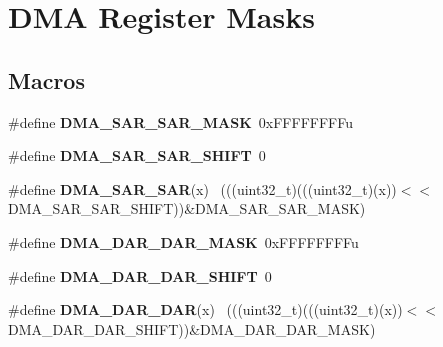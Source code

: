\hypertarget{group___d_m_a___register___masks}{}\section{D\+M\+A Register Masks}
\label{group___d_m_a___register___masks}
\subsection*{Macros}
\begin{DoxyCompactItemize}
\item 
\hypertarget{group___d_m_a___register___masks_ga990e3ca99cc1d75f5942432959953048}{}\#define {\bfseries D\+M\+A\+\_\+\+S\+A\+R\+\_\+\+S\+A\+R\+\_\+\+M\+A\+S\+K}~0x\+F\+F\+F\+F\+F\+F\+F\+Fu\label{group___d_m_a___register___masks_ga990e3ca99cc1d75f5942432959953048}

\item 
\hypertarget{group___d_m_a___register___masks_ga869308e6de564860ede4d607b19bce31}{}\#define {\bfseries D\+M\+A\+\_\+\+S\+A\+R\+\_\+\+S\+A\+R\+\_\+\+S\+H\+I\+F\+T}~0\label{group___d_m_a___register___masks_ga869308e6de564860ede4d607b19bce31}

\item 
\hypertarget{group___d_m_a___register___masks_gac47d99af8e118e771379d8d4888c1543}{}\#define {\bfseries D\+M\+A\+\_\+\+S\+A\+R\+\_\+\+S\+A\+R}(x)                                                  ~(((uint32\+\_\+t)(((uint32\+\_\+t)(x))$<$$<$D\+M\+A\+\_\+\+S\+A\+R\+\_\+\+S\+A\+R\+\_\+\+S\+H\+I\+F\+T))\&D\+M\+A\+\_\+\+S\+A\+R\+\_\+\+S\+A\+R\+\_\+\+M\+A\+S\+K)\label{group___d_m_a___register___masks_gac47d99af8e118e771379d8d4888c1543}

\item 
\hypertarget{group___d_m_a___register___masks_gad24e68800bcb03e0d2ffad9b026d5c28}{}\#define {\bfseries D\+M\+A\+\_\+\+D\+A\+R\+\_\+\+D\+A\+R\+\_\+\+M\+A\+S\+K}~0x\+F\+F\+F\+F\+F\+F\+F\+Fu\label{group___d_m_a___register___masks_gad24e68800bcb03e0d2ffad9b026d5c28}

\item 
\hypertarget{group___d_m_a___register___masks_ga6dc575769385f559893116dabe37a002}{}\#define {\bfseries D\+M\+A\+\_\+\+D\+A\+R\+\_\+\+D\+A\+R\+\_\+\+S\+H\+I\+F\+T}~0\label{group___d_m_a___register___masks_ga6dc575769385f559893116dabe37a002}

\item 
\hypertarget{group___d_m_a___register___masks_ga3a7525dcb66de97f281da1363f3acde4}{}\#define {\bfseries D\+M\+A\+\_\+\+D\+A\+R\+\_\+\+D\+A\+R}(x)                                                  ~(((uint32\+\_\+t)(((uint32\+\_\+t)(x))$<$$<$D\+M\+A\+\_\+\+D\+A\+R\+\_\+\+D\+A\+R\+\_\+\+S\+H\+I\+F\+T))\&D\+M\+A\+\_\+\+D\+A\+R\+\_\+\+D\+A\+R\+\_\+\+M\+A\+S\+K)\label{group___d_m_a___register___masks_ga3a7525dcb66de97f281da1363f3acde4}


\end{DoxyCompactItemize}
